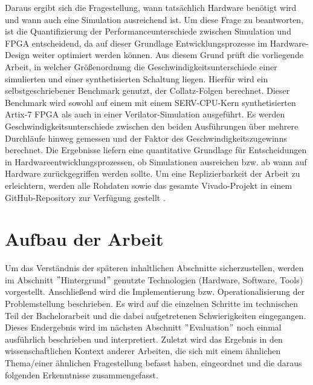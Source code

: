 Daraus ergibt sich die Fragestellung, wann tatsächlich Hardware benötigt wird und wann auch eine Simulation ausreichend ist.
Um diese Frage zu beantworten, ist die Quantifizierung der Performanceunterschiede zwischen Simulation und FPGA entscheidend, da auf dieser Grundlage Entwicklungsprozesse im Hardware-Design weiter optimiert werden können.
Aus diesem Grund prüft die vorliegende Arbeit, in welcher Größenordnung die Geschwindigkeitsunterschiede einer simulierten und einer synthetisierten Schaltung liegen.
Hierfür wird ein selbstgeschriebener Benchmark genutzt, der Collatz-Folgen berechnet.
Dieser Benchmark wird sowohl auf einem mit einem SERV-CPU-Kern \parencite{kindgren_serv} synthetisierten Artix-7 FPGA \parencite{artix-7} als auch in einer Verilator-Simulation \parencite{verilator} ausgeführt.
Es werden Geschwindigkeitsunterschiede zwischen den beiden Ausführungen über mehrere Durchläufe hinweg gemessen und der Faktor des Geschwindigkeitszugewinns berechnet.
Die Ergebnisse liefern eine quantitative Grundlage für Entscheidungen in Hardwareentwicklungsprozessen, ob Simulationen ausreichen bzw. ab wann auf Hardware zurückgegriffen werden sollte.
Um eine Replizierbarkeit der Arbeit zu erleichtern, werden alle Rohdaten sowie das gesamte Vivado-Projekt in einem GitHub-Repository zur Verfügung gestellt \parencite{GitHub-Bachelorarbeit}.



\section{Aufbau der Arbeit}

Um das Verständnis der späteren inhaltlichen Abschnitte sicherzustellen, werden im Abschnitt \("\)Hintergrund\("\) genutzte Technologien (Hardware, Software, Tools) vorgestellt.
Anschließend wird die Implementierung bzw. Operationalisierung der Problemstellung beschrieben.
Es wird auf die einzelnen Schritte im technischen Teil der Bachelorarbeit und die dabei aufgetretenen Schwierigkeiten eingegangen.
Dieses Endergebnis wird im nächsten Abschnitt \("\)Evaluation\("\) noch einmal ausführlich beschrieben und interpretiert.
Zuletzt wird das Ergebnis in den wissenschaftlichen Kontext anderer Arbeiten, die sich mit einem ähnlichen Thema/einer ähnlichen Fragestellung befasst haben, eingeordnet und die daraus folgenden Erkenntnisse zusammengefasst.